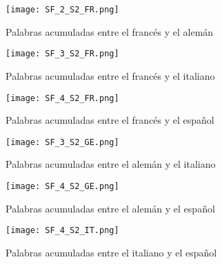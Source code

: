 \begin{figure}[h!]
	\centering
	\texttt{[image: SF\_2\_S2\_FR.png]}
	\label{fig.SF_FG}
	\caption{Palabras acumuladas entre el francés y el alemán}
\end{figure}

\begin{figure}[h!]
	\centering
	\texttt{[image: SF\_3\_S2\_FR.png]}
	\label{fig.SF_FI}
	\caption{Palabras acumuladas entre el francés y el italiano}
\end{figure}

\begin{figure}[h!]
	\centering
	\texttt{[image: SF\_4\_S2\_FR.png]}
	\label{fig.SF_FS}
	\caption{Palabras acumuladas entre el francés y el español}
\end{figure}



\begin{figure}[h!]
	\centering
	\texttt{[image: SF\_3\_S2\_GE.png]}
	\label{fig.SF_GI}
	\caption{Palabras acumuladas entre el alemán y el italiano}
\end{figure}


\begin{figure}[h!]
	\centering
	\texttt{[image: SF\_4\_S2\_GE.png]}
	\label{fig.SF_GS}
	\caption{Palabras acumuladas entre el alemán y el español}
\end{figure}


\begin{figure}[h!]
	\centering
	\texttt{[image: SF\_4\_S2\_IT.png]}
	\label{fig.SF_IS}
	\caption{Palabras acumuladas entre el italiano y el español}
\end{figure}
